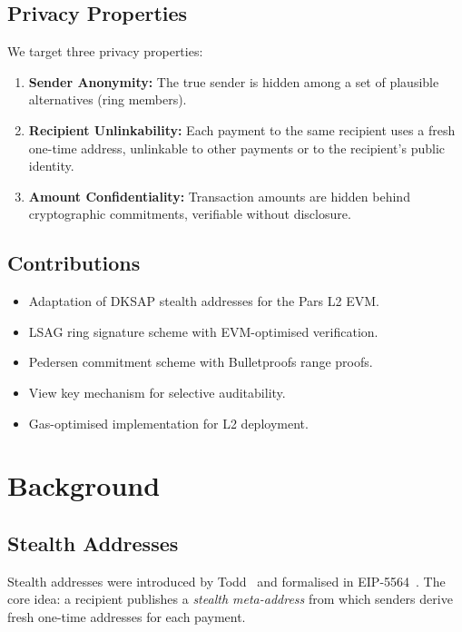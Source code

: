\documentclass[11pt,a4paper]{article}
\begin{document}
\subsection{Privacy Properties}

We target three privacy properties:

\begin{enumerate}
    \item \textbf{Sender Anonymity:} The true sender is hidden among a
    set of plausible alternatives (ring members).
    \item \textbf{Recipient Unlinkability:} Each payment to the same
    recipient uses a fresh one-time address, unlinkable to other payments
    or to the recipient's public identity.
    \item \textbf{Amount Confidentiality:} Transaction amounts are hidden
    behind cryptographic commitments, verifiable without disclosure.
\end{enumerate}

\subsection{Contributions}

\begin{itemize}
    \item Adaptation of DKSAP stealth addresses for the Pars L2 EVM.
    \item LSAG ring signature scheme with EVM-optimised verification.
    \item Pedersen commitment scheme with Bulletproofs range proofs.
    \item View key mechanism for selective auditability.
    \item Gas-optimised implementation for L2 deployment.
\end{itemize}

\section{Background}
\label{sec:background}

\subsection{Stealth Addresses}

Stealth addresses were introduced by
Todd~\cite{todd2014stealth} and formalised in
EIP-5564~\cite{eip5564}.  The core idea: a recipient publishes a
\emph{stealth meta-address} from which senders derive fresh one-time
addresses for each payment.
\end{document}
